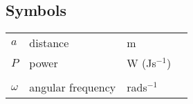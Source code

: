 \subsection*{Symbols}
\normalsize

\begin{supertabular}{p{6mm}p{45mm}p{25mm}l}\\

$a$ & distance & m \\
$P$ & power & W (Js$^{-1}$) \\
& & \\ %
$\omega$ & angular frequency & rads$^{-1}$ \\

\end{supertabular}

\clearpage

